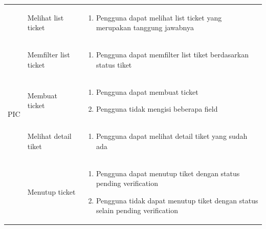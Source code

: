 \documentclass[12pt]{article}
\begin{document}
\begin{enumerate}[label=\textbf{5.\arabic*.}]
\begin{enumerate}[label=\textbf{5.2.\arabic*.}]
\begin{longtable}{ |l|l|p{}| }
            \multirow{7}{*}{PIC} & Melihat list ticket     & \begin{enumerate}[label=\arabic*.] 
                                                                \item Pengguna dapat melihat list ticket yang merupakan tanggung jawabnya 
                                                            \end{enumerate}\\\cline{2-3}
                                & Memfilter list ticket & \begin{enumerate}[label=\arabic*.]
                                                                \item Pengguna dapat memfilter list tiket berdasarkan status tiket  
                                                            \end{enumerate}\\\cline{2-3}
                                & Membuat ticket  & \begin{enumerate}[label=\arabic*.]
                                                                \item Pengguna dapat membuat ticket
                                                                \item Pengguna tidak mengisi beberapa field
                                                            \end{enumerate}\\\cline{2-3}
                                & Melihat detail tiket  & \begin{enumerate}[label=\arabic*.]
                                                                \item Pengguna dapat melihat detail tiket yang sudah ada 
                                                            \end{enumerate}\\\cline{2-3}
                                & Menutup ticket        & \begin{enumerate}[label=\arabic*.]
                                                                \item Pengguna dapat menutup tiket dengan status pending verification
                                                                \item Pengguna tidak dapat menutup tiket dengan status selain pending verification
                                                            \end{enumerate}\\\cline{2-3}

\end{longtable}
\end{enumerate}
\end{enumerate}
\end{document}
